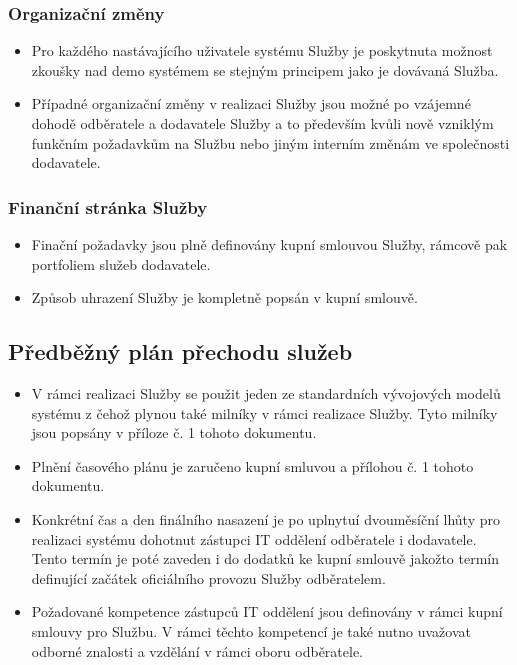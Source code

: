 \documentclass[11pt, a4paper, titlepage]{article}
\begin{document}
	\subsubsection*{Organizační změny}

	\begin{itemize}
		\item Pro každého nastávajícího uživatele systému Služby je poskytnuta možnost zkoušky nad demo systémem se stejným principem jako je dovávaná Služba.
		\item Případné organizační změny v realizaci Služby jsou možné po vzájemné dohodě odběratele a dodavatele Služby a to především kvůli nově vzniklým funkčním požadavkům na Službu nebo jiným interním změnám ve společnosti dodavatele.
	\end{itemize}

	\subsubsection*{Finanční stránka Služby}

	\begin{itemize}
		\item Finační požadavky jsou plně definovány kupní smlouvou Služby, rámcově pak portfoliem služeb dodavatele.
		\item Způsob uhrazení Služby je kompletně popsán v kupní smlouvě.
	\end{itemize}

	\subsection*{Předběžný plán přechodu služeb}

	\begin{itemize}
		\item V rámci realizaci Služby se použit jeden ze standardních vývojových modelů systému z čehož plynou také milníky v rámci realizace Služby. Tyto milníky jsou popsány v příloze č. 1 tohoto dokumentu. 
		\item Plnění časového plánu je zaručeno kupní smluvou a přílohou č. 1 tohoto dokumentu.
		\item Konkrétní čas a den finálního nasazení je po uplnytuí dvouměsíční lhůty pro realizaci systému dohotnut zástupci IT oddělení odběratele i dodavatele. Tento termín je poté zaveden i do dodatků ke kupní smlouvě jakožto termín definující začátek oficiálního provozu Služby odběratelem.
		\item Požadované kompetence zástupců IT oddělení jsou definovány v rámci kupní smlouvy pro Službu. V rámci těchto kompetencí je také nutno uvažovat odborné znalosti a vzdělání v rámci oboru odběratele. 
	\end{itemize}
\end{document}
